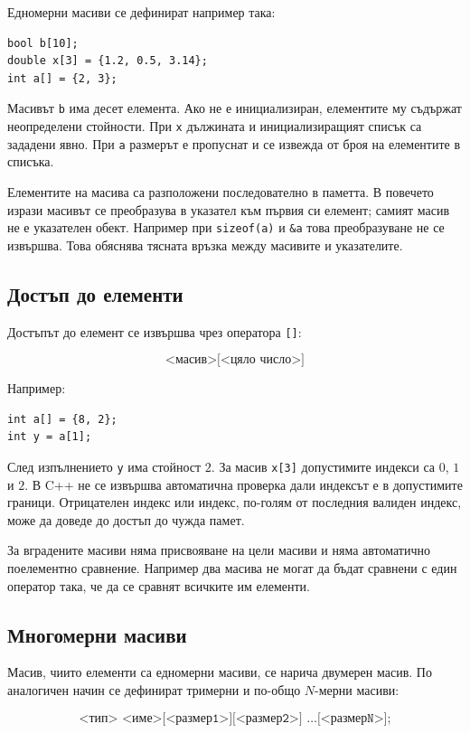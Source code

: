 Едномерни масиви се дефинират например така:

\begin{verbatim}
bool b[10];
double x[3] = {1.2, 0.5, 3.14};
int a[] = {2, 3};
\end{verbatim}

Масивът \texttt{b} има десет елемента. Ако не е инициализиран, елементите му съдържат неопределени стойности. При \texttt{x} дължината и инициализиращият списък са зададени явно. При \texttt{a} размерът е пропуснат и се извежда от броя на елементите в списъка.

Елементите на масива са разположени последователно в паметта. В повечето изрази масивът се преобразува в указател към първия си елемент; самият масив не е указателен обект. Например при \texttt{sizeof(a)} и \texttt{\&a} това преобразуване не се извършва. Това обяснява тясната връзка между масивите и указателите.

\subsection{Достъп до елементи}\label{s:15.2.1}

Достъпът до елемент се извършва чрез оператора \texttt{[]}:

\[
\texttt{<масив>[<цяло число>]}
\]

Например:

\begin{verbatim}
int a[] = {8, 2};
int y = a[1];
\end{verbatim}

След изпълнението \texttt{y} има стойност $2$. За масив \texttt{x[3]} допустимите индекси са $0$, $1$ и $2$. В C++ не се извършва автоматична проверка дали индексът е в допустимите граници. Отрицателен индекс или индекс, по-голям от последния валиден индекс, може да доведе до достъп до чужда памет.

За вградените масиви няма присвояване на цели масиви и няма автоматично поелементно сравнение. Например два масива не могат да бъдат сравнени с един оператор така, че да се сравнят всичките им елементи.

\subsection{Многомерни масиви}\label{s:15.2.2}

\begin{defn}
Масив, чиито елементи са едномерни масиви, се нарича двумерен масив. По аналогичен начин се дефинират тримерни и по-общо $N$-мерни масиви:

\[
\texttt{<тип> <име>[<размер1>][<размер2>] \ldots [<размерN>];}
\]
\end{defn}

